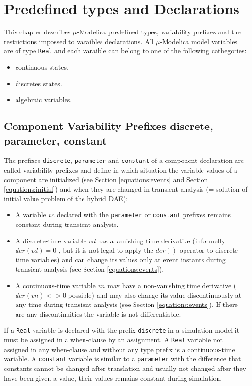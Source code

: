 \documentclass[11pt,a4paper,notitlepage]{report}
\begin{document}
\chapter{Predefined types and Declarations}\label{types}

This chapter describes $\mu$-Modelica predefined types, variability prefixes and the restrictions impossed to varaibles declarations.
All $\mu$-Modelica model variables are of type \verb"Real" and each varaible can belong to one of the following cathegories: 
\begin{itemize}
\item continuous states.
\item discretes states.
\item algebraic variables.
\end{itemize}

\section{Component Variability Prefixes discrete, parameter, constant}

The prefixes \verb"discrete", \verb"parameter" and \verb"constant" of a component declaration are called variability prefixes and define in which situation the variable values of a component are initialized (see Section \ref{equations:events} and Section \ref{equations:initial}) and when they are changed in transient analysis (= solution of initial value problem of the hybrid DAE):
\begin{itemize}
\item A variable $vc$ declared with the \verb"parameter" or \verb"constant" prefixes remains constant during transient analysis.
\item A discrete-time variable $vd$ has a vanishing time derivative (informally $der(vd)=0$ , but it is not legal to apply the $der()$ operator to discrete-time variables) and can change its values only at event instants during transient analysis (see Section \ref{equations:events}).  
\item A continuous-time variable $vn$ may have a non-vanishing time derivative ( $der(vn)<>0$ possible) and may also change its value discontinuously at any time during transient analysis (see Section \ref{equations:events}). If there are any discontinuities the variable is not differentiable. 
\end{itemize}

If a \verb"Real" variable is declared with the prefix \verb"discrete" in a simulation model it must be assigned in a when-clause by an assignment.
A \verb"Real" variable not assigned in any when-clause and without any type prefix is a continuous-time variable.
A \verb"constant" variable is similar to a \verb"parameter" with the difference that constants cannot be changed after translation and usually not changed after they have been given a value, their values remains constant during simulation. 
\end{document}
